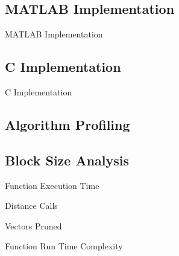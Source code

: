 \subsection{MATLAB Implementation}
\begin{frame}[label=matlab]{MATLAB Implementation}
\end{frame}

\subsection{C Implementation}
\begin{frame}[label=c]{C Implementation}
\end{frame}

\subsection{Algorithm Profiling}

\subsection{Block Size Analysis}
\begin{frame}[label=functionExecutionTime]{Function Execution Time}
\end{frame}

\begin{frame}[label=distanceCalls]{Distance Calls}
\end{frame}

\begin{frame}[label=vectorsPruned]{Vectors Pruned}
\end{frame}

\begin{frame}[label=runTimeComplexity]{Function Run Time Complexity}
    \begin{columns}[c]

    \end{columns}
\end{frame}